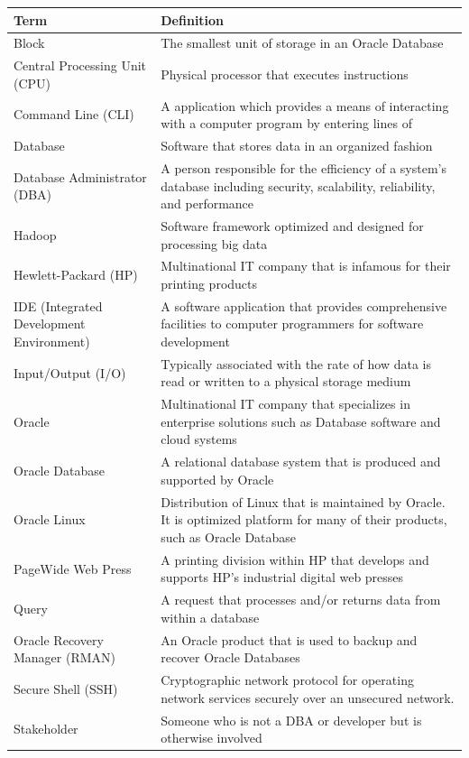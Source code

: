 \documentclass[10pt]{article}
\begin{document}
\begin{center}
    \begin{tabular}{ | l | p{11cm} |}
    \hline
    \textbf{Term} & \textbf{Definition}  \\ \hline
    Block & The smallest unit of storage in an Oracle Database \\ \hline
    Central Processing Unit (CPU) & Physical processor that executes instructions  \\ \hline
    Command Line (CLI) & A application which provides a means of interacting with a computer program by entering lines of \\ \hline
    Database & Software that stores data in an organized fashion \\ \hline
    Database Administrator (DBA) & A person responsible for the efficiency of a system's database including security, scalability, reliability, and performance \\ \hline
    Hadoop & Software framework optimized and designed for processing big data \\ \hline
    Hewlett-Packard (HP) & Multinational IT company that is infamous for their printing products \\ \hline
    IDE (Integrated Development Environment) & A software application that provides comprehensive facilities to computer programmers for software development \\ \hline
    Input/Output (I/O) & Typically associated with the rate of how data is read or written to a physical storage medium \\ \hline
    Oracle & Multinational IT company that specializes in enterprise solutions such as Database software and cloud systems \\ \hline
    Oracle Database & A relational database system that is produced and supported by Oracle \\ \hline
    Oracle Linux & Distribution of Linux that is maintained by Oracle. It is optimized platform for many of their products, such as Oracle Database \\ \hline
    PageWide Web Press & A printing division within HP that develops and supports HP's industrial digital web presses \\ \hline
    Query & A request that processes and/or returns data from within a database \\ \hline
    Oracle Recovery Manager (RMAN) & An Oracle product that is used to backup and recover Oracle Databases \\ \hline
    Secure Shell (SSH) &  Cryptographic network protocol for operating network services securely over an unsecured network. \\ \hline
    Stakeholder & Someone who is not a DBA or developer but is otherwise involved \\ \hline
    \end{tabular}
\end{center}
\end{document}
